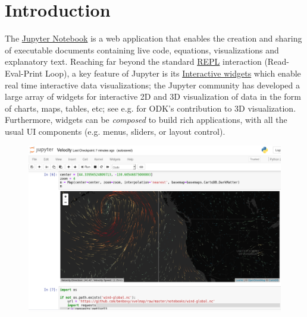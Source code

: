 \documentclass{deliverablereport}
\author{Odile Bénassy and Nicolas M. Thiéry}
\begin{document}
\maketitle
\githubissuedescription

\section{Introduction}


The \href{https://jupyter.org}{Jupyter Notebook} is a web application
that enables the creation and sharing of executable documents
containing live code, equations, visualizations and explanatory text.
Reaching far beyond the standard
\href{https://en.wikipedia.org/wiki/Read-eval-print_loop}{REPL}
interaction (Read-Eval-Print Loop), a key feature of Jupyter is its
\href{http://jupyter.org/widgets}{Interactive widgets} which enable
real time interactive data visualizations; the Jupyter community has
developed a large array of widgets for interactive 2D and 3D
visualization of data in the form of charts, maps, tables, etc; see
e.g.  for ODK's contribution to 3D visualization.
Furthermore, widgets can be \emph{composed} to build rich
applications, with all the usual UI components (e.g. menus, sliders,
or layout control).

\begin{figure}[h]\begin{center}
  \includegraphics[width=\textwidth]{images/Velocity}
\end{center}\end{figure}
\end{document}

